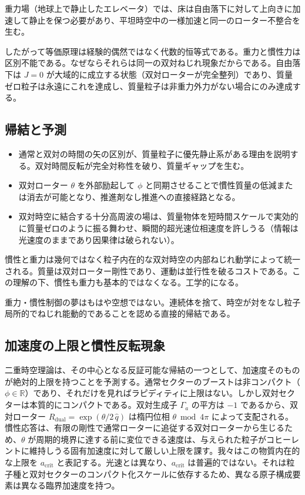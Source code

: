 \documentclass[a4paper]{article}
\begin{document}
重力場（地球上で静止したエレベータ）では、床は自由落下に対して上向きに加速して静止を保つ必要があり、平坦時空中の一様加速と同一のローター不整合を生む。

したがって等価原理は経験的偶然ではなく代数的恒等式である。重力と慣性力は区別不能である。なぜならそれらは同一の双対ねじれ現象だからである。自由落下は $J = 0$ が大域的に成立する状態（双対ローターが完全整列）であり、質量ゼロ粒子は永遠にこれを達成し、質量粒子は非重力外力がない場合にのみ達成する。

\subsection{帰結と予測}

\begin{itemize}
\item 通常と双対の時間の矢の区別が、質量粒子に優先静止系がある理由を説明する。双対時間反転が完全対称性を破り、質量ギャップを生む。
\item 双対ローター $\theta$ を外部励起して $\phi$ と同期させることで慣性質量の低減または消去が可能となり、推進剤なし推進への直接経路となる。
\item 双対時空に結合する十分高周波の場は、質量物体を短時間スケールで実効的に質量ゼロのように振る舞わせ、瞬間的超光速位相速度を許しうる（情報は光速度のままであり因果律は破られない）。
\end{itemize}

慣性と重力は幾何ではなく粒子内在的な双対時空の内部ねじれ動学によって統一される。質量は双対ローター剛性であり、運動は並行性を破るコストである。この理解の下、慣性も重力も基本的ではなくなる。工学的になる。

重力・慣性制御の夢はもはや空想ではない。連続体を捨て、時空が対をなし粒子局所的でねじれ能動的であることを認める直接的帰結である。

\subsection{加速度の上限と慣性反転現象}
\label{subsec:acceleration-limit}

二重時空理論は、その中心となる反証可能な帰結の一つとして、加速度そのものが絶対的上限を持つことを予測する。通常セクターのブーストは非コンパクト（$\phi \in \mathbb{R}$）であり、それだけを見ればラピディティに上限はない。しかし双対セクターは本質的にコンパクトである。双対生成子 $\Gamma_a$ の平方は $-1$ であるから、双対ローター $R_\text{dual} = \exp(\theta/2 \, \hat q)$ は楕円位相 $\theta \bmod 4\pi$ によって支配される。慣性応答は、有限の剛性で通常ローターに追従する双対ローターから生じるため、$\theta$ が周期的境界に達する前に変位できる速度は、与えられた粒子がコヒーレントに維持しうる固有加速度に対して厳しい上限を課す。我々はこの物質内在的な上限を $a_\text{crit}$ と表記する。光速とは異なり、$a_\text{crit}$ は普遍的ではない。それは粒子種と双対セクターのコンパクト化スケールに依存するため、異なる原子構成要素は異なる臨界加速度を持つ。
\end{document}
